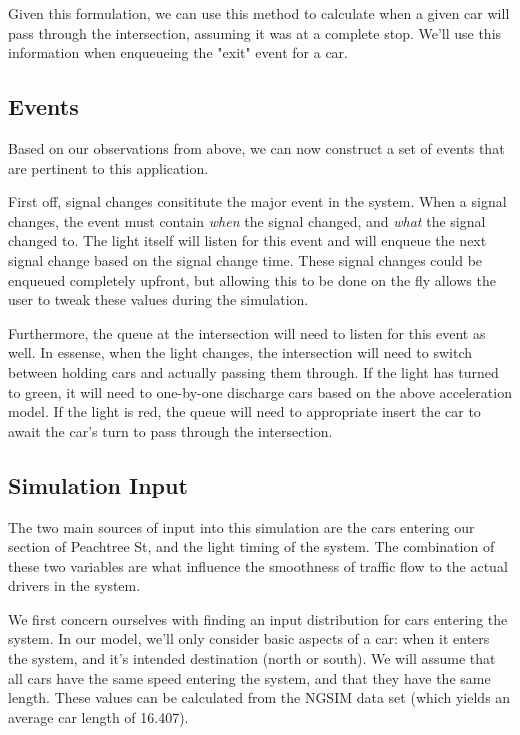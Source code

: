 \documentclass[a4paper,12pt]{article}
\begin{document}
Given this formulation, we can use this method to calculate when a given car will pass through the intersection,
assuming it was at a complete stop. We'll use this information when enqueueing the "exit" event for a car.

\subsection{Events}
Based on our observations from above, we can now construct a set of events that are pertinent to this application.

First off, signal changes consititute the major event in the system. When a signal changes, the event must contain
\emph{when} the signal changed, and \emph{what} the signal changed to. The light itself will listen for this event
and will enqueue the next signal change based on the signal change time. These signal changes could be enqueued
completely upfront, but allowing this to be done on the fly allows the user to tweak these values during the simulation.

Furthermore, the queue at the intersection will need to listen for this event as well. In essense, when the light
changes, the intersection will need to switch between holding cars and actually passing them through. If the light has
turned to green, it will need to one-by-one discharge cars based on the above acceleration model. If the light is red,
the queue will need to appropriate insert the car to await the car's turn to pass through the intersection.

\subsection{Simulation Input}
The two main sources of input into this simulation are the cars entering our section of Peachtree St, and the light
timing of the system. The combination of these two variables are what influence the smoothness
of traffic flow to the actual drivers in the system.

We first concern ourselves with finding an input distribution for cars entering the system. In our model, we'll only
consider basic aspects of a car: when it enters the system, and it's intended destination (north or south). We will assume that all cars have the same speed entering the system, and that they
have the same length. These values can be calculated from the NGSIM data set \cite{ngsim} (which yields an average car length of 16.407).
\end{document}
